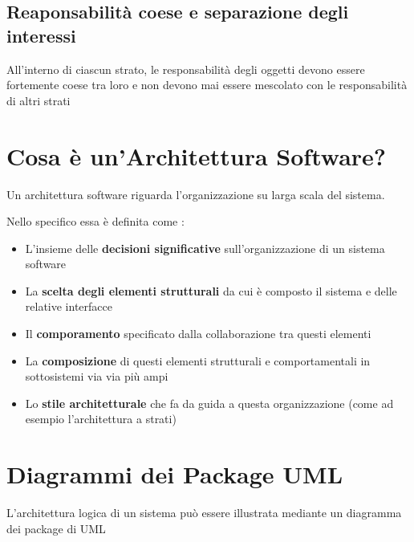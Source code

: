 \subsection{Reaponsabilità coese e separazione degli interessi}
All'interno di ciascun strato, le responsabilità degli oggetti devono essere fortemente coese tra loro e non devono mai essere mescolato con le responsabilità di altri strati

\section{Cosa è un'Architettura Software?}
Un architettura software riguarda l'organizzazione su larga scala del sistema.

Nello specifico essa è definita come :

\begin{itemize}
    \item L'insieme delle \textbf{decisioni significative} sull'organizzazione di un sistema software
    \item La \textbf{scelta degli elementi strutturali} da cui è composto il sistema e delle relative interfacce
    \item Il \textbf{comporamento} specificato dalla collaborazione tra questi elementi
    \item La \textbf{composizione} di questi elementi strutturali e comportamentali in sottosistemi via via più ampi
    \item Lo \textbf{stile architetturale} che fa da guida a questa organizzazione (come ad esempio l'architettura a strati)
\end{itemize}

\section{Diagrammi dei Package UML}
L'architettura logica di un sistema può essere illustrata mediante un diagramma dei package di UML
